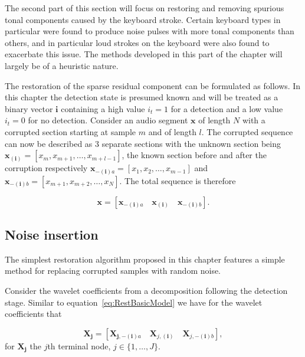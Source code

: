 The second part of this section will focus on restoring and removing spurious tonal components caused by the keyboard stroke. Certain keyboard types in particular were found to produce noise pulses with more tonal components than others, and in particular loud strokes on the keyboard were also found to exacerbate this issue. The methods developed in this part of the chapter will largely be of a heuristic nature.

The restoration of the sparse residual component can be formulated as follows. In this chapter the detection state is presumed known and will be treated as a binary vector $\boldsymbol{i}$ containing a high value $i_t = 1$ for a detection and a low value $i_t = 0$ for no detection. Consider an audio segment $\boldsymbol{x}$ of length $N$ with a corrupted section starting at sample $m$ and of length $l$. The corrupted sequence can now be described as 3 separate sections with the unknown section being $\boldsymbol{x_{(i)}} = [x_m,x_{m+1},\ldots,x_{m+l-1}]$, the known section before and after the corruption respectively $\boldsymbol{x}_{\boldsymbol{-(i)}a} = [x_1,x_{2},\ldots,x_{m-1}]$ and $\boldsymbol{x}_{\boldsymbol{-(i)}b} = [x_{m+1},x_{m+2},\ldots,x_{N}]$. The total sequence is therefore

\begin{equation}\label{eq:RestBasicModel}
\boldsymbol{x} = \left[ \boldsymbol{x}_{\boldsymbol{-(i)}a}\quad\boldsymbol{x_{(i)}}\quad\boldsymbol{x}_{\boldsymbol{-(i)}b} \right].
\end{equation}


\subsection{Noise insertion}
The simplest restoration algorithm proposed in this chapter features a simple method for replacing corrupted samples with random noise.

Consider the wavelet coefficients from a decomposition following the detection stage. Similar to equation~\ref{eq:RestBasicModel} we have for the wavelet coefficients that

\begin{equation}\label{eq:RestBasicModelWavelet1}
\boldsymbol{X_j} = \left[ \boldsymbol{X}_{\boldsymbol{j,-(i)}a}\quad\boldsymbol{X}_{j,\boldsymbol{(i)}}\quad\boldsymbol{X}_{j,\boldsymbol{-(i)}b} \right],
\end{equation}
for $\boldsymbol{X_j}$ the $j$th terminal node, $j \in \{1, \ldots, J\}$.

